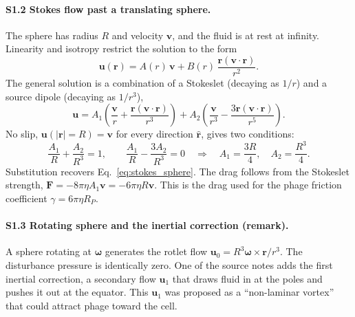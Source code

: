 \paragraph{S1.2 Stokes flow past a translating sphere.} The sphere has radius $R$ and velocity $\bm v$, and the fluid is at rest at infinity. Linearity and isotropy restrict the solution to the form
\begin{equation}
\bm u(\bm r)=A(r)\,\bm v+B(r)\,\frac{\bm r(\bm v\cdot\bm r)}{r^2}.
\end{equation}
The general solution is a combination of a Stokeslet (decaying as $1/r$) and a source dipole (decaying as $1/r^3$),
\begin{equation}
\bm u=A_1\left(\frac{\bm v}{r}+\frac{\bm r(\bm v\cdot\bm r)}{r^3}\right)+A_2\left(\frac{\bm v}{r^3}-\frac{3\bm r(\bm v\cdot\bm r)}{r^5}\right).
\end{equation}
No slip, $\bm u(|\bm r|=R)=\bm v$ for every direction $\hat{\bm r}$, gives two conditions:
\begin{equation}
\frac{A_1}{R}+\frac{A_2}{R^3}=1,\qquad \frac{A_1}{R}-\frac{3A_2}{R^3}=0
\quad\Longrightarrow\quad A_1=\frac{3R}{4},\quad A_2=\frac{R^3}{4}.
\end{equation}
Substitution recovers Eq.~\eqref{eq:stokes_sphere}. The drag follows from the Stokeslet strength, $\bm F=-8\pi\eta A_1\bm v=-6\pi\eta R\bm v$. This is the drag used for the phage friction coefficient $\gamma=6\pi\eta R_P$.

\paragraph{S1.3 Rotating sphere and the inertial correction (remark).} A sphere rotating at $\bm\omega$ generates the rotlet flow $\bm u_0=R^3\bm\omega\times\bm r/r^3$. The disturbance pressure is identically zero. One of the source notes adds the first inertial correction, a secondary flow $\bm u_1$ that draws fluid in at the poles and pushes it out at the equator. This $\bm u_1$ was proposed as a ``non-laminar vortex'' that could attract phage toward the cell.


